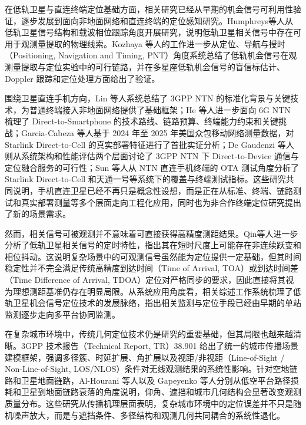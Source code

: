 在低轨卫星与直连终端定位基础方面，相关研究已经从早期的机会信号可利用性验证，逐步发展到面向非地面网络和直连终端的定位感知研究。Humphreys等人从低轨卫星信号结构和载波相位跟踪角度开展研究，说明低轨卫星相关信号中存在可用于观测量提取的物理线索\cite{Humphreys2023StarlinkSignal,Humphreys2023StarlinkCarrier}。Kozhaya 等人的工作进一步从定位、导航与授时（Positioning, Navigation and Timing, PNT）角度系统总结了低轨机会信号在观测量提取与定位实验中的可行链路，并在多星座低轨机会信号的盲信标估计、Doppler 跟踪和定位处理方面给出了验证\cite{Kozhaya2025StarlinkPNT,Kozhaya2023BlindBeaconMultiConstellation}。

围绕卫星直连手机方向，Lin 等人系统总结了 3GPP NTN 的标准化背景与关键技术，为普通终端接入非地面网络提供了基础框架\cite{Lin2021NTN}；He 等人进一步面向 6G NTN 梳理了 Direct-to-Smartphone 的技术路线、链路预算、终端能力约束和关键挑战\cite{He2024DirectSmartphone}；Garcia-Cabeza 等人基于 2024 年至 2025 年美国众包移动网络测量数据，对 Starlink Direct-to-Cell 的真实部署特征进行了首批实证分析\cite{GarciaCabeza2025DirectToCell}；De Gaudenzi 等人则从系统架构和性能评估两个层面讨论了 3GPP NTN 下 Direct-to-Device 通信与定位融合服务的可行性\cite{DeGaudenzi2026D2DPartI,DeGaudenzi2026D2DPartII}；Sun 等人从 NTN 直连手机终端的 OTA 测试角度分析了 Starlink Direct-to-Cell 和天通一号等系统下的覆盖与终端测试指标\cite{Sun2026NTNDirectSmartphoneOTA}。这些研究共同说明，手机直连卫星已经不再只是概念性设想，而是正在从标准、终端、链路测试和真实部署测量等多个层面走向工程化应用，同时也为非合作终端定位研究提出了新的场景需求。

然而，相关信号可被观测并不意味着可直接获得高精度测距结果。Qin等人进一步分析了低轨卫星相关信号的定时特性，指出其在短时尺度上可能存在非连续跃变和相位抖动\cite{Qin2025Timing,Stock2025ErrorSourceStarlink}。这说明复杂场景中的可观测信号虽然能为定位提供一定基础，但其时间稳定性并不完全满足传统高精度到达时间（Time of Arrival, TOA）或到达时间差（Time Difference of Arrival, TDOA）定位对严格同步的要求，因此直接将其视为理想测距基准仍存在明显局限。从系统应用角度看，相关综述工作\cite{Yin2025LEO,AllahvirdiZadeh2025DopplerBroadbandLEO}系统梳理了低轨卫星机会信号定位技术的发展脉络，指出相关监测与定位手段已经由早期的单站监测逐步走向多平台协同监测。

在复杂城市环境中，传统几何定位技术仍是研究的重要基础，但其局限也越来越清晰。3GPP 技术报告（Technical Report, TR）38.901 给出了统一的城市传播场景建模框架，强调多径簇、时延扩展、角扩展以及视距/非视距（Line-of-Sight / Non-Line-of-Sight, LOS/NLOS）条件对无线观测结果的系统性影响\cite{TR38901}。针对空地链路和卫星地面链路，Al-Hourani 等人以及 Gapeyenko 等人分别从低空平台路径损耗和卫星到地面链路衰落的角度说明，仰角、遮挡和城市几何结构会显著改变观测质量分布\cite{AlHourani2014A2GPathLoss,Gapeyenko2017SatGroundPathLoss}。这些研究从传播机理层面表明，复杂城市环境中的定位误差并不只是随机噪声放大，而是与遮挡条件、多径结构和观测几何共同耦合的系统性退化。


